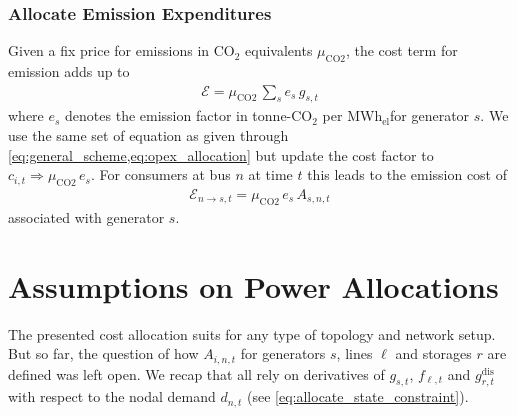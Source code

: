 \documentclass[11pt,twocolumn]{article}
\newcommand{\costfactor}{c_{i,t}}
\newcommand{\generation}{g_{s,t}}
\newcommand{\flow}{f_{\ell,t}}
\newcommand{\storage}{g_{r,t}}
\newcommand{\storagedispatch}{\storage^\text{dis}}
\newcommand{\demand}[1][n]{d_{#1,t}}
\newcommand{\allocategeneration}[1][s, n]{A_{#1,t}}
\newcommand{\allocatestate}[1][i, n]{A_{#1,t}}
\newcommand{\allocateemissioncost}[1][n \rightarrow s]{\mathcal{E}_{#1,t}}
\newcommand{\emission}{e_{s}}
\newcommand{\emissionprice}{\mu_{\text{CO2}}}
\newcommand{\megawatthour}{MWh$_\text{el}$}
\newcommand{\emissioncost}{\mathcal{E}}
\begin{document}
\subsubsection*{Allocate Emission Expenditures}

Given a fix price for emissions in CO$_2$ equivalents $\emissionprice$, the cost term for emission adds up to 
\begin{align}
 \emissioncost = \emissionprice \, \sum_s  \emission \, \generation
\end{align}
where $\emission$ denotes the emission factor in tonne-CO$_2$ per \megawatthour for generator $s$.
We use the same set of equation as given through \cref{eq:general_scheme,eq:opex_allocation} but update the cost factor to $\costfactor \Rightarrow \emissionprice \, \emission$. For consumers at bus $n$ at time $t$ this leads to the emission cost of 
\begin{align}
 \allocateemissioncost = \emissionprice \, \emission \, \allocategeneration
\end{align}
associated with generator $s$.


\section{Assumptions on Power Allocations}
\label{sec:localizing_allocations}

The presented cost allocation suits for any type of topology and network setup. But so far, the question of how $\allocatestate$ for generators $s$, lines $\ell$ and storages $r$ are defined was left open. We recap that all rely on derivatives of $\generation$, $\flow$ and $\storagedispatch$  with respect to the nodal demand $\demand$ (see \cref{eq:allocate_state_constraint}). \\
\end{document}
